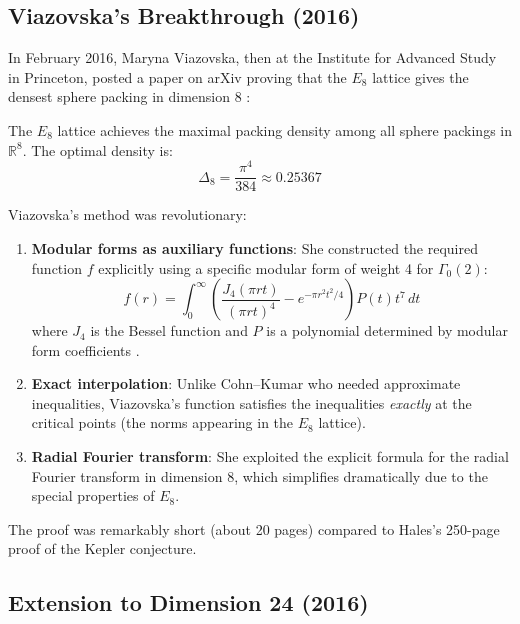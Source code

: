 \subsection{Viazovska's Breakthrough (2016)}

In February 2016, Maryna Viazovska, then at the Institute for Advanced Study in Princeton, posted a paper on arXiv proving that the $E_8$ lattice gives the densest sphere packing in dimension 8 \cite{viazovska2017}:

\begin{theorem}
The $E_8$ lattice achieves the maximal packing density among all sphere packings in $\mathbb{R}^8$. The optimal density is:
\begin{equation}
\Delta_8 = \frac{\pi^4}{384} \approx 0.25367
\end{equation}
\end{theorem}

Viazovska's method was revolutionary:

\begin{enumerate}
\item \textbf{Modular forms as auxiliary functions}: She constructed the required function $f$ explicitly using a specific modular form of weight 4 for $\Gamma_0(2)$:
\begin{equation}
f(r) = \int_0^\infty \left(\frac{J_4(\pi r t)}{(\pi r t)^4} - e^{-\pi r^2 t^2/4}\right) P(t) t^7 \, dt
\end{equation}
where $J_4$ is the Bessel function and $P$ is a polynomial determined by modular form coefficients \cite{viazovska2017}.
\item \textbf{Exact interpolation}: Unlike Cohn--Kumar who needed approximate inequalities, Viazovska's function satisfies the inequalities \emph{exactly} at the critical points (the norms appearing in the $E_8$ lattice).
\item \textbf{Radial Fourier transform}: She exploited the explicit formula for the radial Fourier transform in dimension 8, which simplifies dramatically due to the special properties of $E_8$.
\end{enumerate}

The proof was remarkably short (about 20 pages) compared to Hales's 250-page proof of the Kepler conjecture.

\subsection{Extension to Dimension 24 (2016)}


